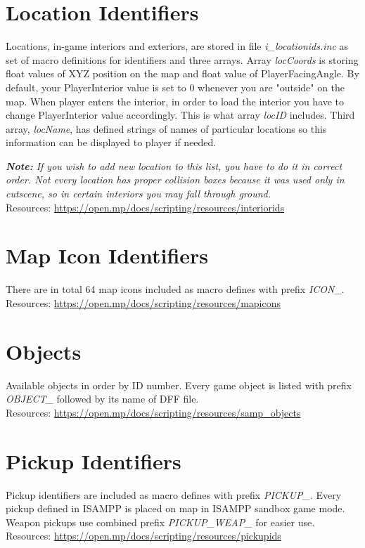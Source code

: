 \documentclass{article}
\begin{document}
\section{Location Identifiers}
\begin{sloppypar}
Locations, in-game interiors and exteriors, are stored in file \textit{i\_locationids.inc} as set of macro definitions for identifiers and three arrays. Array \textit{locCoords} is storing float values of XYZ position on the map and float value of PlayerFacingAngle. By default, your PlayerInterior value is set to 0 whenever you are "outside" on the map. When player enters the interior, in order to load the interior you have to change PlayerInterior value accordingly. This is what array \textit{locID} includes. Third array, \textit{locName}, has defined strings of names of particular locations so this information can be displayed to player if needed.
\end{sloppypar}
\bigskip
\noindent \textit{\textbf{Note:} If you wish to add new location to this list, you have to do it in correct order. Not every location has proper collision boxes because it was used only in cutscene, so in certain interiors you may fall through ground.}
\bigskip
\\Resources: \url{https://open.mp/docs/scripting/resources/interiorids}


\section{Map Icon Identifiers}
There are in total 64 map icons included as macro defines with prefix \textit{ICON\_}.
\bigskip
\\Resources: \url{https://open.mp/docs/scripting/resources/mapicons}


\section{Objects}
Available objects in order by ID number. Every game object is listed with prefix \textit{OBJECT\_} followed by its name of DFF file.
\bigskip
\\Resources: \url{https://open.mp/docs/scripting/resources/samp_objects}


\newpage
\section{Pickup Identifiers}
Pickup identifiers are included as macro defines with prefix \textit{PICKUP\_}. Every pickup defined in ISAMPP is placed on map in ISAMPP sandbox game mode. Weapon pickups use combined prefix \textit{PICKUP\_WEAP\_} for easier use.
\bigskip
\\Resources: \url{https://open.mp/docs/scripting/resources/pickupids}
\end{document}
